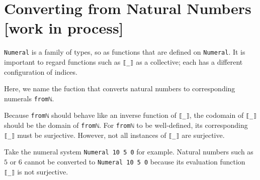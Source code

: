 \documentclass[\main/thesis.tex]{subfiles}
\begin{document}
\section{Converting from Natural Numbers [work in process]}\label{fromnat}

\lstinline|Numeral| is a family of types, so as functions that are defined on
\lstinline|Numeral|.
It is important to regard functions such as \lstinline|⟦_⟧| as a collective;
each has a different configuration of indices.

Here, we name the fuction that converts natural numbers to corresponding
numerals \lstinline|fromℕ|.

\begin{center}
\end{center}

Because \lstinline|fromℕ| should behave like an inverse function of \lstinline|⟦_⟧|,
the codomain of \lstinline|⟦_⟧| should be the domain of \lstinline|fromℕ|.
For \lstinline|fromℕ| to be well-defined, its corresponding \lstinline|⟦_⟧|
must be surjective.
However, not all instances of \lstinline|⟦_⟧| are surjective.

Take the numeral system \lstinline|Numeral 10 5 0| for example.
Natural numbers such as $ 5 $ or $ 6 $ cannot be converted to
\lstinline|Numeral 10 5 0| because its evaluation function \lstinline|⟦_⟧|
is not surjective.
\end{document}
